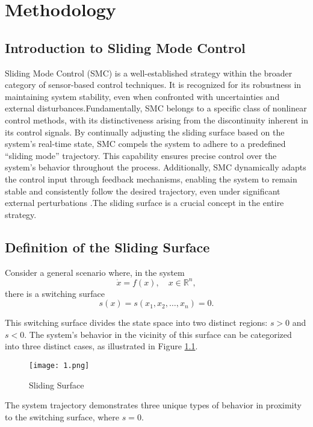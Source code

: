 \chapter{Methodology}

\section{Introduction to Sliding Mode Control}

Sliding Mode Control (SMC) is a well-established strategy within the broader category of sensor-based control techniques. It is recognized for its robustness in maintaining system stability, even when confronted with uncertainties and external disturbances\cite{Hoy2015}.Fundamentally, SMC belongs to a specific class of nonlinear control methods, with its distinctiveness arising from the discontinuity inherent in its control signals. By continually adjusting the sliding surface based on the system's real-time state, SMC compels the system to adhere to a predefined ``sliding mode'' trajectory. This capability ensures precise control over the system's behavior throughout the process. Additionally, SMC dynamically adapts the control input through feedback mechanisms, enabling the system to remain stable and consistently follow the desired trajectory, even under significant external perturbations \cite{Liu2012}.The sliding surface is a crucial concept in the entire strategy.


\section{Definition of the Sliding Surface}
Consider a general scenario where, in the system 
\[
\dot{x} = f(x), \quad x \in \mathbb{R}^n,
\]
there is a switching surface 
\[
s(x) = s(x_1, x_2, \dots, x_n) = 0.
\]

This switching surface divides the state space into two distinct regions: \(s > 0\) and \(s < 0\). The system's behavior in the vicinity of this surface can be categorized into three distinct cases, as illustrated in Figure \ref{FIG:1}.



\begin{figure}[H]
    \centering
    \texttt{[image: 1.png]}
    \caption{Sliding Surface} %
    \label{FIG:1}
\end{figure}

The system trajectory demonstrates three unique types of behavior in proximity to the switching surface, where \(s = 0\).


